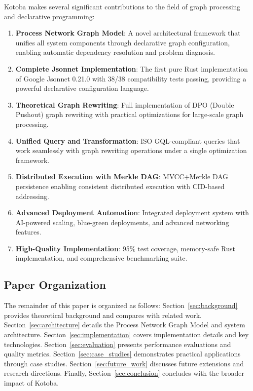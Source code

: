 \documentclass[11pt,a4paper]{article}
\begin{document}
Kotoba makes several significant contributions to the field of graph processing and declarative programming:

\begin{enumerate}
\item \textbf{Process Network Graph Model}: A novel architectural framework that unifies all system components through declarative graph configuration, enabling automatic dependency resolution and problem diagnosis.

\item \textbf{Complete Jsonnet Implementation}: The first pure Rust implementation of Google Jsonnet 0.21.0 with 38/38 compatibility tests passing, providing a powerful declarative configuration language.

\item \textbf{Theoretical Graph Rewriting}: Full implementation of DPO (Double Pushout) graph rewriting with practical optimizations for large-scale graph processing.

\item \textbf{Unified Query and Transformation}: ISO GQL-compliant queries that work seamlessly with graph rewriting operations under a single optimization framework.

\item \textbf{Distributed Execution with Merkle DAG}: MVCC+Merkle DAG persistence enabling consistent distributed execution with CID-based addressing.

\item \textbf{Advanced Deployment Automation}: Integrated deployment system with AI-powered scaling, blue-green deployments, and advanced networking features.

\item \textbf{High-Quality Implementation}: 95\% test coverage, memory-safe Rust implementation, and comprehensive benchmarking suite.
\end{enumerate}

\subsection{Paper Organization}
\label{subsec:organization}

The remainder of this paper is organized as follows: Section~\ref{sec:background} provides theoretical background and compares with related work. Section~\ref{sec:architecture} details the Process Network Graph Model and system architecture. Section~\ref{sec:implementation} covers implementation details and key technologies. Section~\ref{sec:evaluation} presents performance evaluations and quality metrics. Section~\ref{sec:case_studies} demonstrates practical applications through case studies. Section~\ref{sec:future_work} discusses future extensions and research directions. Finally, Section~\ref{sec:conclusion} concludes with the broader impact of Kotoba.
\end{document}
